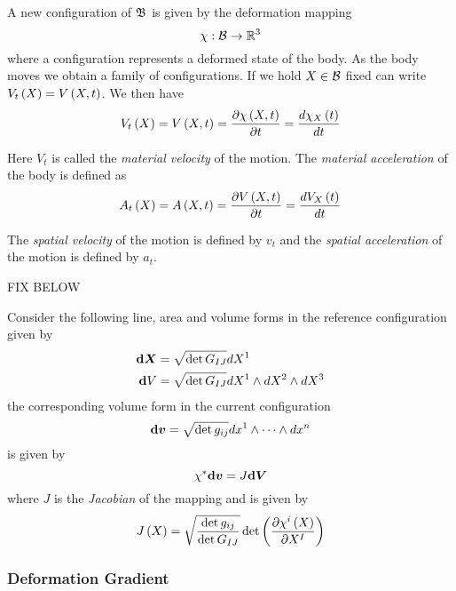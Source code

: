 A new configuration of $ \mathfrak{B} $ is given by the deformation mapping
\begin{equation}
  \mapping{\chi}{\embedmanifold{B}}{\rntopology{3}}
\end{equation}
where a configuration represents a deformed state of the body. As the body
moves we obtain a family of configurations. If we hold $X\in \mathcal{B} $
fixed can write $ V_{t}\left( X \right) = V\left( X,t \right) $. We then have
\begin{equation}
   V_{t}\left( X \right) = V\left( X,t \right) = \dfrac{\partial  \chi\left( X,t \right) }{\partial t} = \dfrac{ d  \chi_{X}\left( t \right) }{d t} 
\end{equation}

Here $V_{t}$ is called the \emph{material velocity} of the motion. The
\emph{material acceleration} of the body is defined as
\begin{equation}
   A_{t}\left( X \right) = A\left( X,t \right) = \dfrac{\partial  V\left( X,t \right) }{\partial t} = \dfrac{ d  V_{X}\left( t \right) }{d t} 
\end{equation}

The \emph{spatial velocity} of the motion is defined by $v_{t}$ and the
\emph{spatial acceleration} of the motion is defined by $a_{t}$.

FIX BELOW

Consider the following line, area and volume forms in the reference configuration given by
\begin{align}
    \boldsymbol{\mathrm{d}} \boldsymbol{X} &=\sqrt{\det{G_{IJ}}}dX^{1} \\
    \boldsymbol{\mathrm{d}}  V &=\sqrt{\det{G_{IJ}}}  dX^{1} \wedge dX^{2}  \wedge dX^{3} 
\end{align}
the corresponding volume form in the current configuration
\begin{equation}
    \boldsymbol{\mathrm{d}} \boldsymbol{v} =\sqrt{\det{g_{ij}}}  dx^{1} \wedge \cdots  \wedge dx^{n} 
\end{equation}
is given by
\begin{equation}
   \chi^{*}  \boldsymbol{\mathrm{d}} \boldsymbol{v}  =J  \boldsymbol{\mathrm{d}} \boldsymbol{V} 
\end{equation}
where $J$ is the \emph{Jacobian} of the mapping and is given by
\begin{equation}
   J\left( X \right) =\sqrt{\dfrac{\det{g_{ij}}}{\det{G_{IJ}}}}\det{\ensuremath{\left(  \dfrac{\partial  \chi^{i}\left( X \right) }{\partial X^{I}}  \right)}}
\end{equation}

\subsubsection{Deformation Gradient}

